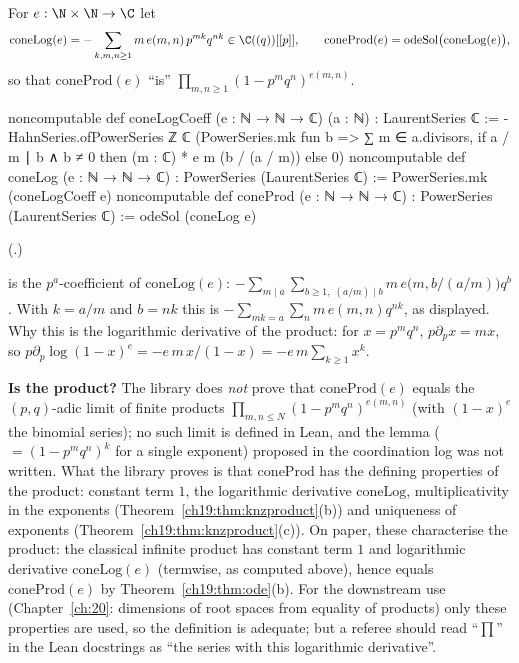 \begin{definition}\label{ch19:def:coneprod}
For $e:\N\times\N\to\C$ let
\begin{equation*}
  \mathrm{coneLog}(e)=-\sum_{k,m,n\ge1}m\,e(m,n)\,p^{mk}q^{nk}\in\C((q))[[p]],\qquad
  \mathrm{coneProd}(e)=\mathrm{odeSol}\bigl(\mathrm{coneLog}(e)\bigr),
\end{equation*}
so that $\mathrm{coneProd}(e)$ ``is'' $\prod_{m,n\ge1}(1-p^mq^n)^{e(m,n)}$.
\end{definition}
\begin{leancode}
noncomputable def coneLogCoeff (e : ℕ → ℕ → ℂ) (a : ℕ) : LaurentSeries ℂ :=
  -HahnSeries.ofPowerSeries ℤ ℂ (PowerSeries.mk fun b =>
    ∑ m ∈ a.divisors, if a / m ∣ b ∧ b ≠ 0 then (m : ℂ) * e m (b / (a / m)) else 0)
noncomputable def coneLog (e : ℕ → ℕ → ℂ) : PowerSeries (LaurentSeries ℂ) :=
  PowerSeries.mk (coneLogCoeff e)
noncomputable def coneProd (e : ℕ → ℕ → ℂ) : PowerSeries (LaurentSeries ℂ) :=
  odeSol (coneLog e)
\end{leancode}
(.)
\begin{dictionary}
 is the $p^a$-coefficient of $\mathrm{coneLog}(e)$: $-\sum_{m\mid a}\sum_{b\ge1,\;(a/m)\mid b}m\,e\bigl(m,b/(a/m)\bigr)q^b$.
With $k=a/m$ and $b=nk$ this is $-\sum_{mk=a}\sum_nm\,e(m,n)q^{nk}$, as displayed.  Why this is the logarithmic derivative of
the product: for $x=p^mq^n$, $p\partial_px=mx$, so $p\partial_p\log(1-x)^{e}=-e\,m\,x/(1-x)=-e\,m\sum_{k\ge1}x^k$.

\textbf{Is  the product?}  The library does \emph{not} prove that $\mathrm{coneProd}(e)$ equals the
$(p,q)$-adic limit of finite products $\prod_{m,n\le N}(1-p^mq^n)^{e(m,n)}$ (with $(1-x)^e$ the binomial series); no such
limit is defined in Lean, and the lemma  ($=(1-p^mq^n)^k$ for a single exponent) proposed in the
coordination log was not written.  What the library proves is that $\mathrm{coneProd}$ has the defining properties of the
product: constant term $1$, the logarithmic derivative $\mathrm{coneLog}$, multiplicativity in the exponents
(Theorem~\ref{ch19:thm:knzproduct}(b)) and uniqueness of exponents (Theorem~\ref{ch19:thm:knzproduct}(c)).  On paper,
these characterise the product: the classical infinite product has constant term $1$ and logarithmic derivative
$\mathrm{coneLog}(e)$ (termwise, as computed above), hence equals $\mathrm{coneProd}(e)$ by Theorem~\ref{ch19:thm:ode}(b).
For the downstream use (Chapter~\ref{ch:20}: dimensions of root spaces from equality of products) only these properties
are used, so the definition is adequate; but a referee should read ``$\prod$'' in the Lean docstrings as
``the series with this logarithmic derivative''.
\end{dictionary}
